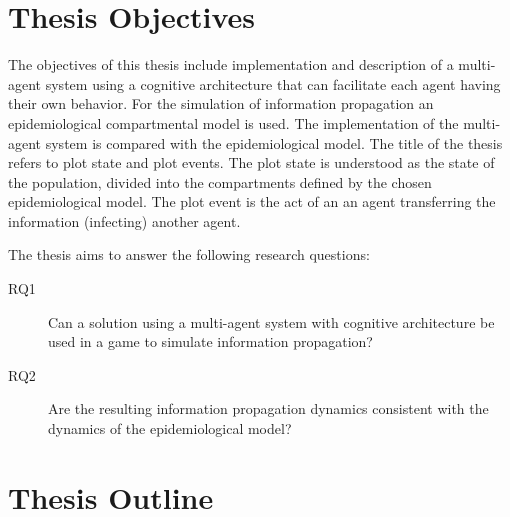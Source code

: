 
\section*{Thesis Objectives}

The objectives of this thesis include implementation and description of a multi-agent system using a cognitive architecture that can facilitate each agent having their own behavior.
For the simulation of information propagation an epidemiological compartmental model is used.
The implementation of the multi-agent system is compared with the epidemiological model.
The title of the thesis refers to plot state and plot events.
The plot state is understood as the state of the population, divided into the compartments defined by the chosen epidemiological model.
The plot event is the act of an an agent transferring the information (infecting) another agent.

The thesis aims to answer the following research questions:

\begin{description}
    \item[RQ1] Can a solution using a multi-agent system with cognitive architecture be used in a game to simulate information propagation?
    \item[RQ2] Are the resulting information propagation dynamics consistent with the dynamics of the epidemiological model?
\end{description}


\section*{Thesis Outline}

